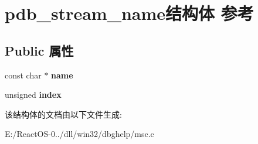 \hypertarget{structpdb__stream__name}{}\section{pdb\+\_\+stream\+\_\+name结构体 参考}
\label{structpdb__stream__name}
\subsection*{Public 属性}
\begin{DoxyCompactItemize}
\item 
\mbox{\label{structpdb__stream__name_a469fd08a6a76e236e1ec4931ace6b18a}} 
const char $\ast$ {\bfseries name}
\item 
\mbox{\label{structpdb__stream__name_a9476f9d701fce3e501c39457acf6bf5e}} 
unsigned {\bfseries index}
\end{DoxyCompactItemize}


该结构体的文档由以下文件生成\+:\begin{DoxyCompactItemize}
\item 
E\+:/\+React\+O\+S-\/0../dll/win32/dbghelp/msc.\+c\end{DoxyCompactItemize}
